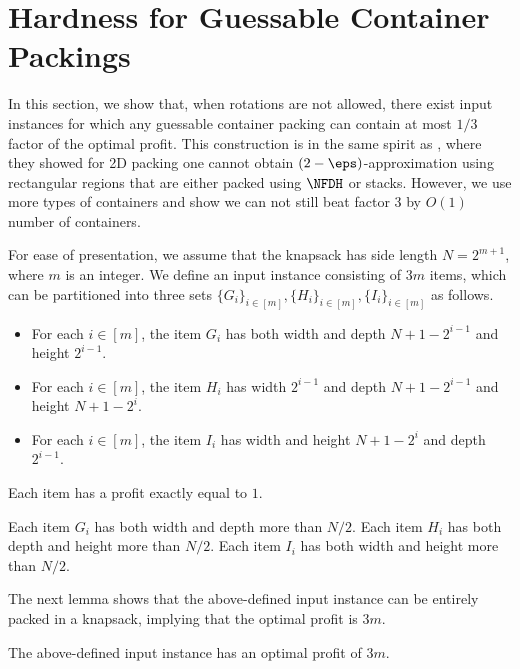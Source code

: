 \section{Hardness for Guessable Container Packings}
\label{sec:hardnesscontainer}
In this section, we show that, when rotations are not allowed, there exist input instances for which any guessable container packing can contain at most $1/3$ factor of the optimal profit.
This construction is in the same spirit as \cite{2dks-Lpacking}, where they showed for 2D packing one cannot obtain $(2-\eps)$-approximation using rectangular regions that are either packed using $\NFDH$ or stacks.
However, we use more types of containers and show we can not still beat factor 3 by $O(1)$ number of containers. 

For ease of presentation, we assume that the knapsack has side length $N=2^{m+1}$, where $m$ is an integer. 
We define an input instance consisting of $3m$ items, which can be partitioned into three sets $\{G_i\}_{i\in[m]},\{H_i\}_{i\in[m]},\{I_i\}_{i\in[m]}$ as follows.
\begin{itemize}
    \item For each $i\in[m]$, the item $G_i$ has both width and depth $N+1-2^{i-1}$ and height $2^{i-1}$.
    \item For each $i\in[m]$, the item $H_i$ has width $2^{i-1}$ and depth $N+1-2^{i-1}$ and height $N+1-2^{i}$.
    \item For each $i\in[m]$, the item $I_i$ has width and height $N+1-2^{i}$ and depth $2^{i-1}$.
\end{itemize}
Each item has a profit exactly equal to $1$.
\begin{remark}
    \label{remark:hardness}
    Each item $G_i$ has both width and depth more than $N/2$. Each item $H_i$ has both depth and height more than $N/2$. Each item $I_i$ has both width and height more than $N/2$.
\end{remark}
The next lemma shows that the above-defined input instance can be entirely packed in a knapsack, implying that the optimal profit is $3m$.
\begin{lemma}
    \label{lem:opt-hardness}
    The above-defined input instance has an optimal profit of $3m$.
\end{lemma}
